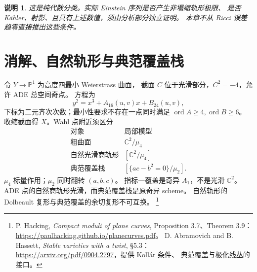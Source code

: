 \documentclass[UTF8,fontset=fandol,zihao=-4,oneside,openany]{ctexbook}
\theoremstyle{cjkplain}
\newtheorem{remark}[theorem]{说明}
\numberwithin{equation}{chapter}
\begin{document}
\begin{remark}
这是纯代数分类。实际 Einstein 序列是否产生非塌缩轨形极限、
是否 Kähler、射影、且具有上述数值，须由分析部分独立证明。
本章不从 Ricci 误差趋零直接推出这些条件。
\end{remark}

\section{消解、自然轨形与典范覆盖栈}

令 $Y\to\mathbb P^1$ 为高度四最小 Weierstrass 曲面，
截面 $C$ 位于光滑部分，$C^2=-4$，允许 ADE 总空间奇点。
方程为
\begin{equation}
y^2=x^3+A_{16}(u,v)x+B_{24}(u,v),
\label{ALG:weierstrass}
\end{equation}
下标为二元齐次次数；最小性要求不存在一点同时满足
$\operatorname{ord}A\ge4,\operatorname{ord}B\ge6$。
收缩截面得 $X$。Wahl 点附近须区分
\[
\begin{array}{c|c}
\text{对象}&\text{局部模型}\\ \hline
\text{粗曲面}&\mathbb C^2/\mu_4\\
\text{自然光滑商轨形}&[\mathbb C^2/\mu_4]\\
\text{典范覆盖栈}&[\{ac-b^2=0\}/\mu_2].
\end{array}
\]
$\mu_4$ 标量作用；$\mu_2$ 同时翻转 $(a,b,c)$。
指标一覆盖是奇异 $A_1$，不是光滑 $\mathbb C^2$。
ADE 点的自然商轨形光滑，而典范覆盖栈是原奇异 scheme。
自然轨形的 Dolbeault 复形与典范覆盖的余切复形不可互换。
\footnote{P. Hacking, \emph{Compact moduli of plane curves},
Proposition 3.7、Theorem 3.9：
\url{https://paulhacking.github.io/planecurves.pdf}。
D. Abramovich and B. Hassett, \emph{Stable varieties with a twist}, \S5.3：
\url{https://arxiv.org/pdf/0904.2797}，提供 Kollár 条件、
典范覆盖与极化线丛的接口。}
\end{document}

